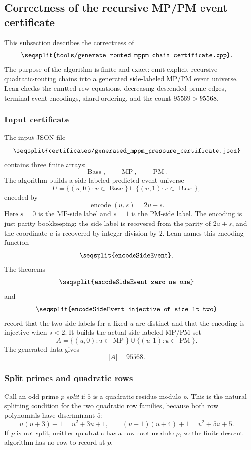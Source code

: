 \documentclass[11pt]{article}
\newcommand{\Lean}[1]{\texttt{\seqsplit{#1}}}
\newcommand{\Code}[1]{\texttt{\seqsplit{#1}}}
\begin{document}
\subsection{Correctness of the recursive MP/PM event certificate}
\label{sec:events}

This subsection describes the correctness of
\[
  \Code{tools/generate\_routed\_mppm\_chain\_certificate.cpp}.
\]
The purpose of the algorithm is finite and exact: emit explicit recursive
quadratic-routing chains into a generated side-labeled MP/PM event universe.
Lean checks the emitted row equations, decreasing descended-prime edges,
terminal event encodings, shard ordering, and the count \(95569>95568\).

\subsubsection{Input certificate}

The input JSON file
\[
  \Code{certificates/generated\_mppm\_pressure\_certificate.json}
\]
contains three finite arrays:
\[
  \operatorname{Base},\qquad \operatorname{MP},\qquad \operatorname{PM}.
\]
The algorithm builds a side-labeled predicted event universe
\[
  U=\{(u,0):u\in\operatorname{Base}\}
    \cup
    \{(u,1):u\in\operatorname{Base}\},
\]
encoded by
\[
  \operatorname{encode}(u,s)=2u+s.
\]
Here \(s=0\) is the MP-side label and \(s=1\) is the PM-side label.  The
encoding is just parity bookkeeping: the side label is recovered from the
parity of \(2u+s\), and the coordinate \(u\) is recovered by integer division
by \(2\).  Lean names this encoding function
\[
  \Lean{encodeSideEvent}.
\]
The theorems
\[
  \Lean{encodeSideEvent\_zero\_ne\_one}
\]
and
\[
  \Lean{encodeSideEvent\_injective\_of\_side\_lt\_two}
\]
record that the two side labels for a fixed \(u\) are distinct and that the
encoding is injective when \(s<2\).
It builds the actual side-labeled MP/PM set
\[
  A=\{(u,0):u\in\operatorname{MP}\}
    \cup
    \{(u,1):u\in\operatorname{PM}\}.
\]
The generated data gives
\[
  |A|=95568.
\]

\subsubsection{Split primes and quadratic rows}

Call an odd prime \(p\) \emph{split} if \(5\) is a quadratic residue modulo
\(p\).  This is the natural splitting condition for the two quadratic row
families, because both row polynomials have discriminant \(5\):
\[
  u(u+3)+1=u^2+3u+1,
  \qquad
  (u+1)(u+4)+1=u^2+5u+5.
\]
If \(p\) is not split, neither quadratic has a row root modulo \(p\), so the
finite descent algorithm has no row to record at \(p\).
\end{document}
